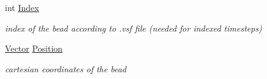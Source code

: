 \begin{DoxyCompactItemize}
\mbox{\label{structBead_ae003205c8e4d1059a5f906ae9c3cb6f9}} 
int \hyperlink{structBead_ae003205c8e4d1059a5f906ae9c3cb6f9}{Index}
\begin{DoxyCompactList}\small\item\em index of the bead according to .vsf file (needed for indexed timesteps) \end{DoxyCompactList}\item 
\mbox{\label{structBead_a0da2a14cebcc5cc1405f362d69904f62}} 
\hyperlink{structVector}{Vector} \hyperlink{structBead_a0da2a14cebcc5cc1405f362d69904f62}{Position}
\begin{DoxyCompactList}\small\item\em cartesian coordinates of the bead \end{DoxyCompactList}\end{DoxyCompactItemize}
